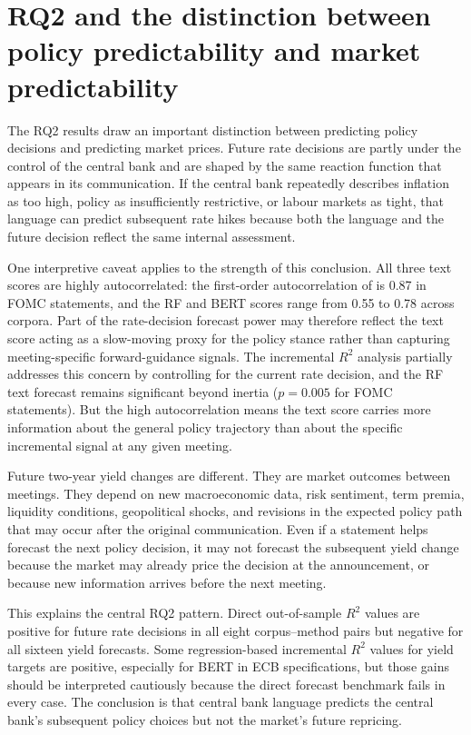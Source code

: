\section{RQ2 and the distinction between policy predictability and market predictability}
\label{sec:disc_rq2_interpretation}

The RQ2 results draw an important distinction between predicting policy decisions
and predicting market prices. Future rate decisions are partly under the control
of the central bank and are shaped by the same reaction function that appears in
its communication. If the central bank repeatedly describes inflation as too
high, policy as insufficiently restrictive, or labour markets as tight, that
language can predict subsequent rate hikes because both the language and the
future decision reflect the same internal assessment.

One interpretive caveat applies to the strength of this conclusion. All three
text scores are highly autocorrelated: the first-order autocorrelation of
\netscore{} is 0.87 in FOMC statements, and the RF and BERT scores range from
0.55 to 0.78 across corpora. Part of the rate-decision forecast power may
therefore reflect the text score acting as a slow-moving proxy for the policy
stance rather than capturing meeting-specific forward-guidance signals. The
incremental $R^2$ analysis partially addresses this concern by controlling for
the current rate decision, and the RF text forecast remains significant beyond
inertia ($p=0.005$ for FOMC statements). But the high autocorrelation means
the text score carries more information about the general policy trajectory
than about the specific incremental signal at any given meeting.

Future two-year yield changes are different. They are market outcomes between
meetings. They depend on new macroeconomic data, risk sentiment, term premia,
liquidity conditions, geopolitical shocks, and revisions in the expected policy
path that may occur after the original communication. Even if a statement helps
forecast the next policy decision, it may not forecast the subsequent yield
change because the market may already price the decision at the announcement, or
because new information arrives before the next meeting.

This explains the central RQ2 pattern. Direct out-of-sample $R^2$ values are
positive for future rate decisions in all eight corpus--method pairs but negative
for all sixteen yield forecasts. Some regression-based incremental $R^2$ values
for yield targets are positive, especially for BERT in ECB
specifications, but those gains should be interpreted cautiously because the
direct forecast benchmark fails in every case. The conclusion is that central
bank language predicts the central bank's subsequent policy choices but not the
market's future repricing.

